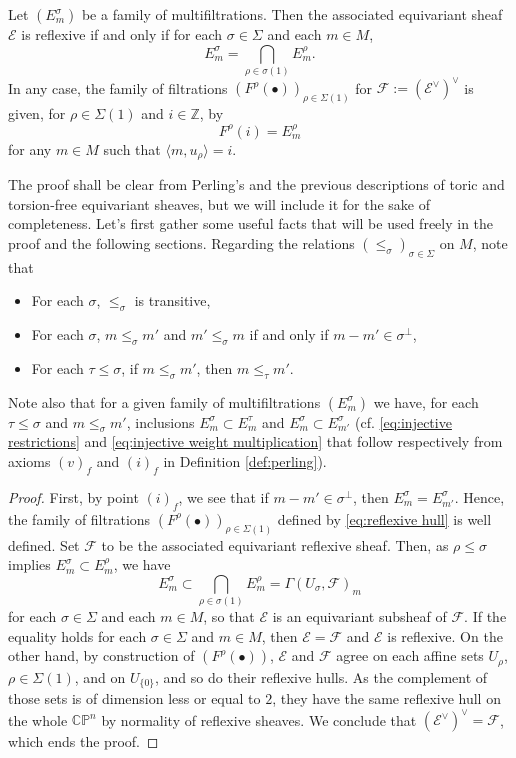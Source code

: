 \documentclass[a4paper,10pt]{amsart}
\theoremstyle{plain}{
    \newtheorem{theorem}{Theorem}[section]
    \newtheorem{lemma}[theorem]{Lemma}
    \newtheorem{corollary}[theorem]{Corollary}
    \newtheorem{proposition}[theorem]{Proposition}
    \newtheorem{conjecture}[theorem]{Conjecture}
}
\theoremstyle{definition}{
    \newtheorem{definition}[theorem]{Definition}
    \newtheorem{defn-thm}[theorem]{Definition-Theorem}
    \newtheorem{example}[theorem]{Example}
    \newtheorem{notation}[theorem]{Notation}
}
\theoremstyle{remark}{
    \newtheorem{remark}[theorem]{Remark}
    \newtheorem{problem}[theorem]{Problem}
    \newtheorem{question}[theorem]{Question}
}
\def\cF{\mathcal{F}}
\def\cE{\mathcal{E}}
\def\Z{\mathbb{Z}}
\def\P{\mathbb{P}}
\def\C{\mathbb{C}}
\begin{document}
\begin{lemma}
 \label{lem:reflexive hull}
 Let $(E^\sigma_m)$ be a family of multifiltrations. Then the associated equivariant sheaf $\cE$ is reflexive if and only if for each $\sigma\in\Sigma$ and each $m\in M$,
 $$
 E^\sigma_m=\bigcap_{\rho\in\sigma(1)} E^\rho_m.
 $$
 In any case, the family of filtrations $(F^\rho(\bullet))_{\rho\in\Sigma(1)}$ for $\cF:=(\cE^\vee)^\vee$ is given, for $\rho\in\Sigma(1)$ and $i\in\Z$, by
 \begin{equation}
  \label{eq:reflexive hull}
 F^\rho(i)=E^\rho_m
 \end{equation}
 for any $m\in M$ such that $\langle m , u_\rho \rangle =i$.
\end{lemma}
The proof shall be clear from Perling's \cite{Per04} and the previous descriptions of toric and torsion-free equivariant sheaves, but we will include it for the sake of completeness. Let's first gather some useful facts that will be used freely in the proof and the following sections. Regarding the relations $(\leq_\sigma)_{\sigma\in\Sigma}$ on $M$, note that
\begin{itemize}
 \item[(i)] For each $\sigma$, $\leq_\sigma$ is transitive,
 \item[(ii)] For each $\sigma$,  $m\leq_\sigma m'$ and $m'\leq_\sigma m$ if and only if $m-m'\in\sigma^\perp$,
 \item[(iii)] For each $\tau\leq\sigma$, if $m\leq_\sigma m'$, then $m\leq_\tau m'$.
\end{itemize}
Note also that for a given family of multifiltrations $(E^\sigma_m)$ we have, for each $\tau\leq \sigma$ and $m\leq_\sigma m'$, inclusions $E^\sigma_m \subset E^\tau_m$ and $E^\sigma_m\subset E^\sigma_{m'}$ (cf. \eqref{eq:injective restrictions} and \eqref{eq:injective weight multiplication} that follow respectively from axioms $(v)_f$ and $(i)_f$ in Definition \ref{def:perling}).

\begin{proof}
 First, by point $(i)_f$, we see that if $m-m'\in\sigma^\perp$, then $E^\sigma_m=E^\sigma_{m'}$. Hence, the family of filtrations $(F^\rho(\bullet))_{\rho\in\Sigma(1)}$ defined by \eqref{eq:reflexive hull} is well defined. Set $\cF$ to be the associated equivariant reflexive sheaf. Then, as $\rho\leq \sigma$ implies $E^\sigma_m\subset E^\rho_m$, we have
 $$E^\sigma_m\subset \bigcap_{\rho\in\sigma(1)} E^\rho_m=\Gamma(U_\sigma,\cF)_m$$ for each $\sigma\in\Sigma$ and each $m\in M$, so that $\cE$ is an equivariant subsheaf of $\cF$. If the equality holds for each $\sigma\in\Sigma$ and $m\in M$, then $\cE=\cF$ and $\cE$ is reflexive. On the other hand, by construction of $(F^\rho(\bullet))$, $\cE$ and $\cF$ agree on each affine sets $U_\rho$, $\rho\in\Sigma(1)$, and on $U_{\lbrace 0\rbrace}$, and so do their reflexive hulls. As the complement of those sets is of dimension less or equal to $2$, they have the same reflexive hull on the whole $\C\P^n$ by normality of reflexive sheaves. We conclude that $(\cE^\vee)^\vee=\cF$, which ends the proof.
\end{proof}
\end{document}
